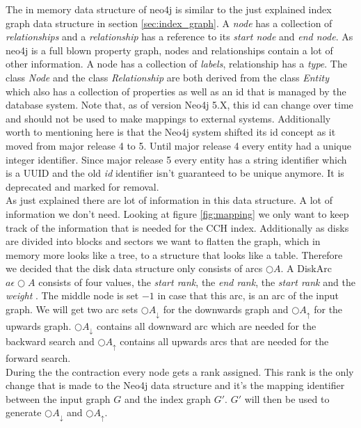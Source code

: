 The in memory data structure of neo4j is similar to the just explained index graph data structure in section \ref{sec:index_graph}.
A \textit{node} has a collection of \textit{relationships} and a \textit{relationship} has a reference to its \textit{start node} and \textit{end node}.
As neo4j is a full blown property graph, nodes and relationships contain a lot of other information.
A node has a collection of \textit{labels}, relationship has a \textit{type}.
The class \textit{Node} and the class \textit{Relationship} 
are both derived from the class \textit{Entity} which also has a collection of properties as well as an id that is managed by the database system.
Note that, as of version Neo4j 5.X, this id can change over time and should not be used to make mappings to external systems.
Additionally worth to mentioning here is that the Neo4j system shifted its id concept as it moved from major release 4 to 5.
Until major release 4 every entity had a unique integer identifier.
Since major release 5 every entity has a string identifier which is a UUID and the old \textit{id} identifier isn't guaranteed to be unique anymore.
It is deprecated and marked for removal.
\\
As just explained there are lot of information in this data structure.
A lot of information we don't need.
Looking at figure \ref{fig:mapping} we only want to keep track of the information that is needed for the CCH index.
Additionally as disks are divided  into blocks and sectors we want to flatten the graph, which in memory more looks like a tree, to a structure that looks like a table.
Therefore we decided that the disk data structure only consists of arcs $\bigcirc A$.
A DiskArc $a \epsilon \bigcirc A$ consists of four values, 
the \textit{start rank}, the \textit{end rank}, the \textit{start rank} and the \textit{weight} .
The middle node is set $-1$ in case that this arc, is an arc of the input graph.
We will get two arc sets $\bigcirc A_\downarrow$ for the downwards graph and $\bigcirc A_\uparrow $ for the upwards graph.
$\bigcirc A_\downarrow$ contains all downward arc which are needed for the backward search and $\bigcirc A_\uparrow$ contains all upwards arcs that are needed for the forward search.
\\
During the the contraction every node gets a rank assigned.
This rank is the only change that is made to the Neo4j data structure and it's the mapping identifier between the input graph $G$ and the index graph $G'$.
$G'$ will then be used to generate $\bigcirc A_\downarrow$ and $\bigcirc A_\uparrow$.


